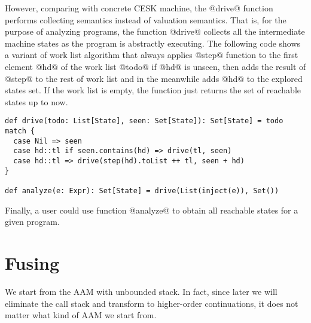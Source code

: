 \documentclass[acmsmall,review,anonymous]{acmart}\settopmatter{printfolios=true,printccs=false,printacmref=false}
\begin{document}
However, comparing with concrete CESK machine, the
@drive@ function performs collecting semantics instead of valuation
semantics. That is, for the purpose of analyzing programs, the function @drive@
collects all the intermediate machine states as the program is abstractly executing.
The following code shows a variant of work list algorithm that always applies @step@
function to the first element @hd@ of the work list @todo@ if @hd@
is unseen, then adds the result of @step@ to the rest of work list and in 
the meanwhile adds @hd@ to the explored states set.
If the work list is empty, the function just returns the set of reachable states up to now.

\begin{lstlisting}
def drive(todo: List[State], seen: Set[State]): Set[State] = todo match {
  case Nil => seen
  case hd::tl if seen.contains(hd) => drive(tl, seen)
  case hd::tl => drive(step(hd).toList ++ tl, seen + hd)
}

def analyze(e: Expr): Set[State] = drive(List(inject(e)), Set())
\end{lstlisting}

Finally, a user could use function @analyze@ to obtain all reachable states 
for a given program.


\section{Fusing}

We start from the AAM with unbounded stack.
In fact, since later we will eliminate the call stack and transform to
higher-order continuations, it does not matter what kind of AAM we start from.
\end{document}
